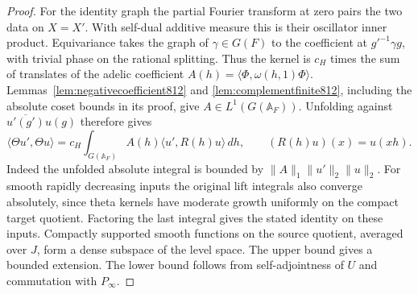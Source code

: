 \documentclass[a4paper,11pt]{article}
\theoremstyle{definition}
\theoremstyle{remark}
\numberwithin{equation}{section}
\begin{document}
\begin{proof}
For the identity graph the partial Fourier transform at
zero pairs the two data on \(X=X'\). With self-dual additive
measure this is their oscillator inner product. Equivariance
takes the graph of \(\gamma\in G(F)\) to the coefficient at
\(g'^{-1}\gamma g\), with trivial phase on the rational
splitting. Thus the kernel is \(c_H\) times
the sum of translates of the adelic coefficient
\(A(h)=\langle\Phi,\omega(h,1)\Phi\rangle\).
Lemmas~\ref{lem:negativecoefficient812} and
\ref{lem:complementfinite812}, including the absolute
coset bounds in its proof, give \(A\in L^1(G(\mathbb A_F))\).
Unfolding against \(\overline{u'(g')}u(g)\) therefore gives
\[
 \langle\Theta u',\Theta u\rangle
       =c_H\int_{G(\mathbb A_F)}
                         A(h)\langle u',R(h)u\rangle\,dh ,
 \qquad (R(h)u)(x)=u(xh).
\]
Indeed the unfolded absolute integral is bounded by
\(\|A\|_1\|u'\|_2\|u\|_2\). For smooth rapidly decreasing
inputs the original lift integrals also converge absolutely,
since theta kernels have moderate growth uniformly on the
compact target quotient. Factoring the last integral gives
the stated identity on these inputs. Compactly supported
smooth functions on the source quotient, averaged over
\(J\), form a dense subspace of the level space. The upper
bound gives a bounded extension. The lower bound follows
from self-adjointness of \(U\) and commutation with
\(P_\infty\).
\end{proof}
\end{document}
